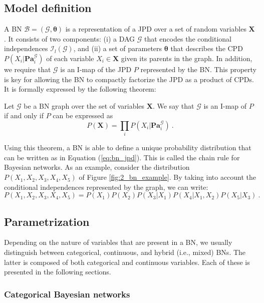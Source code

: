 \subsection{Model definition}
A BN $\mathcal{B} = (\mathcal{G}, \bm{\theta})$ is a representation of a JPD over a set of random variables $\mathbf{X}$. It consists of two components: (i) a DAG $\mathcal{G}$ that encodes the conditional independences $\mathcal{I}_{l}(\mathcal{G})$, and (ii) a set of parameters $\bm{\theta}$ that describes the CPD $P(X_{i} | \mathbf{Pa}^{\mathcal{G}}_{i})$ of each variable $X_{i} \in \mathbf{X}$ given its parents in the graph. In addition, we require that $\mathcal{G}$ is an I-map of the JPD $P$ represented by the BN. This property is key for allowing the BN to compactly factorize the JPD as a product of CPDs. It is formally expressed by the following theorem:
\begin{thm}
	{\normalfont\citep{pearl1988}} Let $\mathcal{G}$ be a BN graph over the set of variables $\mathbf{X}$. We say that $\mathcal{G}$ is an I-map of $P$ if and only if $P$ can be expressed as
	\begin{equation}
	\label{eq:bn_jpd}
	P(\mathbf{X}) = \prod_{i} P(X_{i} | \mathbf{Pa}_{i}^{\mathcal{G}}) \ .
	\end{equation}
\end{thm}
Using this theorem, a BN is able to define a unique probability distribution that can be written as in Equation (\ref{eq:bn_jpd}). This is called the chain rule for Bayesian networks. As an example, consider the distribution $P(X_{1},X_{2},X_{3},X_{4},X_{5})$ of Figure \ref{fig:2_bn_example}. By taking into account the conditional independences represented by the graph, we can write:
\begin{equation*}
P(X_{1},X_{2},X_{3},X_{4},X_{5}) = P(X_{1})P(X_{2})P(X_{3}|X_{1})P(X_{4}|X_{1},X_{2})P(X_{5}|X_{3}) \ .
\end{equation*}

\subsection{Parametrization}
Depending on the nature of variables that are present in a BN, we usually distinguish between categorical, continuous, and hybrid (i.e., mixed) BNs. The latter is composed of both categorical and continuous variables. Each of these is presented in the following sections.

\subsubsection{Categorical Bayesian networks}

